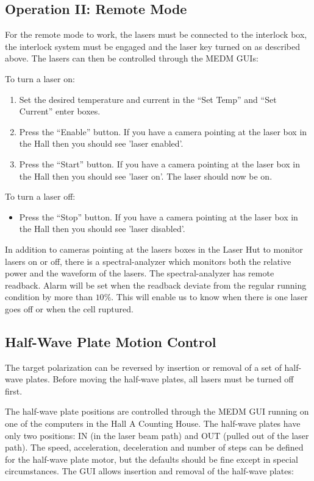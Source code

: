\subsection{Operation II: Remote Mode}

For the remote mode to work, 
the lasers must be connected to the interlock box,
the interlock system must be engaged and
the laser key turned on as described above. The lasers can then 
be controlled through the MEDM GUIs:

To turn a laser on:
\begin{enumerate} \setlength{\parskip}{0ex}
\item Set the desired temperature and current in the ``Set Temp'' 
and ``Set Current'' enter boxes.
\item Press the ``Enable'' button.  If you have a camera pointing
at the laser box in the Hall then you should see 'laser enabled'.
\item Press the ``Start'' button.  If you have a camera pointing
at the laser box in the Hall then you should see 'laser on'.  The
laser should now be on.
\end{enumerate}
To turn a laser off:
\begin{itemize}
\item Press the ``Stop'' button.  If you have a camera pointing
at the laser box in the Hall then you should see 'laser disabled'.
\end{itemize}

In addition to cameras pointing at the lasers boxes in the Laser Hut to 
monitor lasers on or off, there is a spectral-analyzer which monitors
both the relative power and the waveform of the lasers. The spectral-analyzer 
has remote readback.  Alarm will be set when the readback deviate
from the regular running condition by more than $10\%$. This will enable us 
to know when there is one laser goes off or when the cell ruptured.

\subsection{Half-Wave Plate Motion Control}
The target polarization can be reversed by insertion or removal of 
a set of half-wave plates. Before moving the half-wave plates, all lasers
must be turned off first.

The half-wave plate positions are controlled through the MEDM GUI running
on one of the computers in the Hall A Counting House.  The half-wave plates
have only two positions: IN (in the laser beam path) and OUT (pulled out
of the laser path).  The speed, acceleration, deceleration and number of
steps can be defined for the half-wave plate motor, but the defaults
should be fine except in special circumstances.  The GUI allows 
insertion and removal of the half-wave plates:


